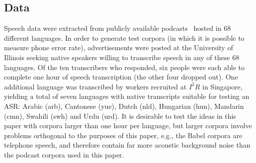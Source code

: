 \subsection{Data}
\label{sec:data}

Speech data were extracted from publicly available podcasts~\cite{SBS}
hosted in 68 different languages.  In order to generate test corpora
(in which it is possible to measure phone error rate), advertisements
were posted at the University of Illinois seeking native speakers
willing to transcribe speech in any of these 68 languages.  Of the ten
transcribers who responded, six people were each able to complete one
hour of speech transcription (the other four dropped out).  One
additional language was transcribed by workers recruited at $I^2R$ in
Singapore, yielding a total of seven languages with native
transcripts suitable for testing an ASR: Arabic (arb), Cantonese
(yue), Dutch (nld), Hungarian (hun), Mandarin (cmn), Swahili (swh) and
Urdu (urd).
{\color{blue} It is desirable to test the ideas in this paper with corpora larger
than one hour per language, but larger corpora involve problems
orthogonal to the purposes of this paper, e.g., the Babel corpora
are telephone speech, and therefore contain far more acoustic
background noise than the podcast corpora used in this paper.}

